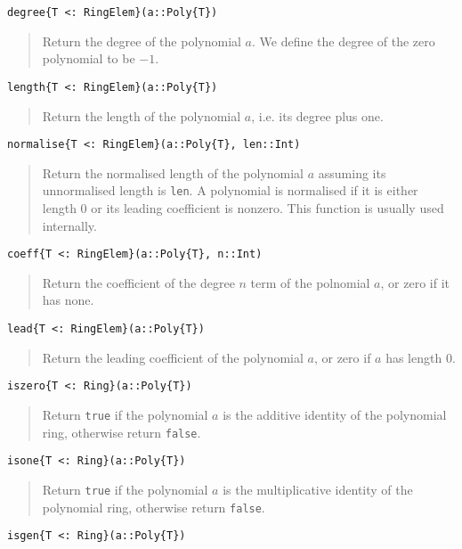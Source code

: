 \documentclass[a4paper,10pt]{article}
\newcommand{\code}{\lstinline}
\newcommand{\desc}[1]{\vspace{-3mm}\begin{quote}#1\end{quote}}
\begin{document}
\begin{lstlisting}
degree{T <: RingElem}(a::Poly{T})
\end{lstlisting}

\desc{Return the degree of the polynomial $a$. We define the degree of the zero
polynomial to be $-1$.}

\begin{lstlisting}
length{T <: RingElem}(a::Poly{T})
\end{lstlisting}

\desc{Return the length of the polynomial $a$, i.e. its degree plus one.}

\begin{lstlisting}
normalise{T <: RingElem}(a::Poly{T}, len::Int)
\end{lstlisting}

\desc{Return the normalised length of the polynomial $a$ assuming its unnormalised
length is \code{len}. A polynomial is normalised if it is either length $0$ or its
leading coefficient is nonzero. This function is usually used internally.}

\begin{lstlisting}
coeff{T <: RingElem}(a::Poly{T}, n::Int)
\end{lstlisting}

\desc{Return the coefficient of the degree $n$ term of the polnomial $a$, or zero
if it has none.}

\begin{lstlisting}
lead{T <: RingElem}(a::Poly{T})
\end{lstlisting}

\desc{Return the leading coefficient of the polynomial $a$, or zero if $a$ has
length $0$.}

\begin{lstlisting}
iszero{T <: Ring}(a::Poly{T})
\end{lstlisting}

\desc{Return \code{true} if the polynomial $a$ is the additive identity of the
polynomial ring, otherwise return \code{false}.}

\begin{lstlisting}
isone{T <: Ring}(a::Poly{T})
\end{lstlisting}

\desc{Return \code{true} if the polynomial $a$ is the multiplicative identity
of the polynomial ring, otherwise return \code{false}.}

\begin{lstlisting}
isgen{T <: Ring}(a::Poly{T})
\end{lstlisting}
\end{document}
